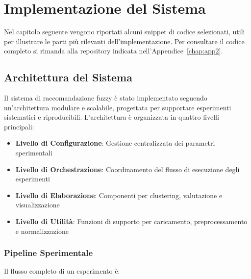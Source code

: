 \chapter{Implementazione del Sistema}
\label{chap:chap4}

Nel capitolo seguente vengono riportati alcuni snippet di codice selezionati, utili per illustrare le parti più rilevanti dell'implementazione. Per consultare il codice completo si rimanda alla repository indicata nell'Appendice~\ref{chap:app2}.

\section{Architettura del Sistema}

Il sistema di raccomandazione fuzzy è stato implementato seguendo un'architettura modulare e scalabile, progettata per supportare esperimenti sistematici e riproducibili. L'architettura è organizzata in quattro livelli principali:

\begin{itemize}
    \item \textbf{Livello di Configurazione}: Gestione centralizzata dei parametri sperimentali
    \item \textbf{Livello di Orchestrazione}: Coordinamento del flusso di esecuzione degli esperimenti
    \item \textbf{Livello di Elaborazione}: Componenti per clustering, valutazione e visualizzazione
    \item \textbf{Livello di Utilità}: Funzioni di supporto per caricamento, preprocessamento e normalizzazione
\end{itemize}

\subsection{Pipeline Sperimentale}
Il flusso completo di un esperimento è:

